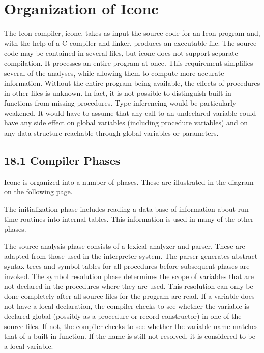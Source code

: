 \chapter{Organization of Iconc}

The Icon compiler, iconc, takes as input the source code for an Icon
program and, with the help of a C compiler and linker, produces an
executable file. The source code may be contained in several files,
but iconc does not support separate compilation. It processes an
entire program at once. This requirement simplifies several of the
analyses, while allowing them to compute more accurate
information. Without the entire program being available, the effects
of procedures in other files is unknown. In fact, it is not possible
to distinguish built-in functions from missing procedures. Type
inferencing would be particularly weakened. It would have to assume
that any call to an undeclared variable could have any side effect on
global variables (including procedure variables) and on any data
structure reachable through global variables or parameters.


\section[18.1 Compiler Phases]{18.1 Compiler Phases}

Iconc is organized into a number of phases. These are illustrated in
the diagram on the following page.

The initialization phase includes reading a data base of information
about run-time routines into internal tables. This information is used
in many of the other phases.

The source analysis phase consists of a lexical analyzer and
parser. These are adapted from those used in the interpreter
system. The parser generates abstract syntax trees and symbol tables
for all procedures before subsequent phases are invoked. The symbol
resolution phase determines the scope of variables that are not
declared in the procedures where they are used. This resolution can
only be done completely after all source files for the program are
read. If a variable does not have a local declaration, the compiler
checks to see whether the variable is declared global (possibly as a
procedure or record constructor) in one of the source files. If not,
the compiler checks to see whether the variable name matches that of a
built-in function. If the name is still not resolved, it is considered
to be a local variable.


